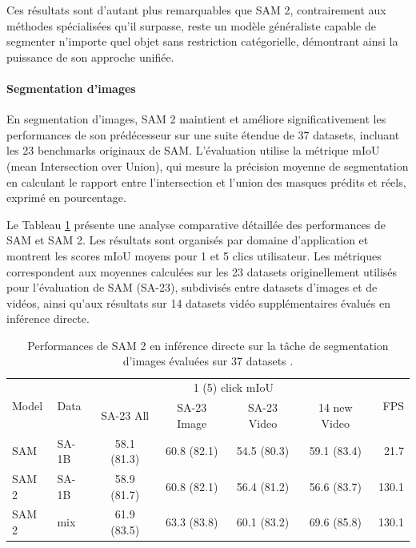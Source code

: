 Ces résultats sont d'autant plus remarquables que SAM 2, contrairement aux méthodes spécialisées qu'il surpasse, reste un modèle généraliste capable de segmenter n'importe quel objet sans restriction catégorielle, démontrant ainsi la puissance de son approche unifiée.

\paragraph{Segmentation d'images}

En segmentation d'images, SAM 2 maintient et améliore significativement les performances de son prédécesseur sur une suite étendue de 37 datasets, incluant les 23 benchmarks originaux de SAM. L'évaluation utilise la métrique mIoU (mean Intersection over Union), qui mesure la précision moyenne de segmentation en calculant le rapport entre l'intersection et l'union des masques prédits et réels, exprimé en pourcentage.

Le Tableau \ref{tab:ch2_sam2_resultats_segmentation_image_miou} présente une analyse comparative détaillée des performances de SAM et SAM 2. Les résultats sont organisés par domaine d'application et montrent les scores mIoU moyens pour 1 et 5 clics utilisateur. Les métriques correspondent aux moyennes calculées sur les 23 datasets originellement utilisés pour l'évaluation de SAM (SA-23), subdivisés entre datasets d'images et de vidéos, ainsi qu'aux résultats sur 14 datasets vidéo supplémentaires évalués en inférence directe.

\begin{table}[H]
    \centering
    \begin{tabular}{llccccr}
        \multirow{2}{*}{Model} & \multirow{2}{*}{Data} & \multicolumn{4}{c}{1 (5) click mIoU} & \multirow{2}{*}{FPS} \\
        \cline{3-6}
        & & SA-23 All & SA-23 Image & SA-23 Video & 14 new Video & \\
        \hline
        SAM & SA-1B & 58.1 (81.3) & 60.8 (82.1) & 54.5 (80.3) & 59.1 (83.4) & 21.7 \\
        SAM 2 & SA-1B & 58.9 (81.7) & 60.8 (82.1) & 56.4 (81.2) & 56.6 (83.7) & 130.1 \\
        SAM 2 & mix & 61.9 (83.5) & 63.3 (83.8) & 60.1 (83.2) & 69.6 (85.8) & 130.1 \\
        \hline
    \end{tabular}
    \caption{Performances de SAM 2 en inférence directe sur la tâche de segmentation d'images évaluées sur 37 datasets \cite{ravi_sam_2024}.}
    \label{tab:ch2_sam2_resultats_segmentation_image_miou}
\end{table}

